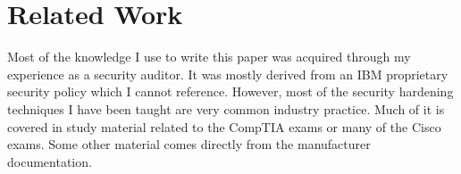\section{Related Work} \label{sec:related_work}
Most of the knowledge I use to write this paper was acquired through my experience as a security auditor.  It was mostly derived from an IBM proprietary security policy which I cannot reference.  However, most of the security hardening techniques I have been taught are very common industry practice.  Much of it is covered in study material related to the CompTIA exams or many of the Cisco exams.  Some other material comes directly from the manufacturer documentation.  


